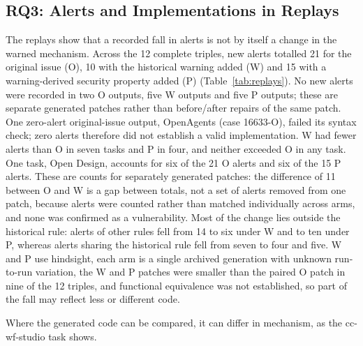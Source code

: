 \documentclass[acmsmall,screen,nonacm]{acmart}
\begin{document}
\subsection{RQ3: Alerts and Implementations in Replays}\label{sec:rq3-res}



The replays show that a recorded fall in alerts is not by itself a change in the warned mechanism. Across the 12 complete triples, new alerts totalled 21 for the original issue (O), 10 with the historical warning added (W) and 15 with a warning-derived security property added (P) (Table~\ref{tab:replays}). No new alerts were recorded in two O outputs, five W outputs and five P outputs; these are separate generated patches rather than before/after repairs of the same patch. One zero-alert original-issue output, OpenAgents (case 16633-O), failed its syntax check; zero alerts therefore did not establish a valid implementation. W had fewer alerts than O in seven tasks and P in four, and neither exceeded O in any task. One task, Open Design, accounts for six of the 21 O alerts and six of the 15 P alerts. These are counts for separately generated patches: the difference of 11 between O and W is a gap between totals, not a set of alerts removed from one patch, because alerts were counted rather than matched individually across arms, and none was confirmed as a vulnerability. Most of the change lies outside the historical rule: alerts of other rules fell from 14 to six under W and to ten under P, whereas alerts sharing the historical rule fell from seven to four and five. W and P use hindsight, each arm is a single archived generation with unknown run-to-run variation, the W and P patches were smaller than the paired O patch in nine of the 12 triples, and functional equivalence was not established, so part of the fall may reflect less or different code.

Where the generated code can be compared, it can differ in mechanism, as the cc-wf-studio task shows.
\end{document}
